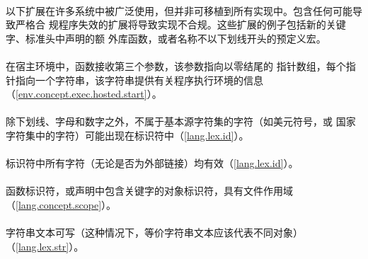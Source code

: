 \paragraph{}
以下扩展在许多系统中被广泛使用，但并非可移植到所有实现中。包含任何可能导致严格合
规程序失效的扩展将导致实现不合规。这些扩展的例子包括新的关键字、标准头中声明的额
外库函数，或者名称不以下划线开头的预定义宏。

\paragraph{}
在宿主环境中，函数接收第三个参数，该参数指向以零结尾的
指针数组，每个指针指向一个字符串，该字符串提供有关程序执行环境的信息
（\ref{env.concept.exec.hosted.start}）。

\paragraph{}
除下划线\tm{\_}、字母和数字之外，不属于基本源字符集的字符（如美元符号\tm{\$}，或
国家字符集中的字符）可能出现在标识符中（\ref{lang.lex.id}）。

\paragraph{}
标识符中所有字符（无论是否为外部链接）均有效（\ref{lang.lex.id}）。

\paragraph{}
函数标识符，或声明中包含关键字的对象标识符，具有文件作用域
（\ref{lang.concept.scope}）。

\paragraph{}
字符串文本可写（这种情况下，等价字符串文本应该代表不同对象）
（\ref{lang.lex.str}）。

